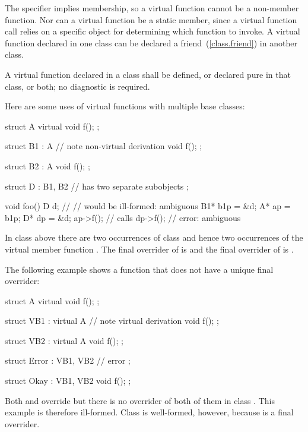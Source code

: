 \pnum
\begin{note}
The  specifier implies membership, so a virtual function
cannot be a non-member function. Nor can a virtual
function be a static member, since a virtual function call relies on a
specific object for determining which function to invoke. A virtual
function declared in one class can be declared a friend~(\ref{class.friend}) in
another class.
\end{note}

\pnum
{}%
A virtual function declared in a class shall be defined, or declared
pure in that class, or both; no diagnostic is
required.
%

\pnum
{}%
\begin{example}
Here are some uses of virtual functions with multiple base classes:
\begin{codeblock}
struct A {
  virtual void f();
};

struct B1 : A {                 // note non-virtual derivation
  void f();
};

struct B2 : A {
  void f();
};

struct D : B1, B2 {             //  has two separate  subobjects
};

void foo() {
  D   d;
//                  // would be ill-formed: ambiguous
  B1*  b1p = &d;
  A*   ap = b1p;
  D*   dp = &d;
  ap->f();                      // calls 
  dp->f();                      // error: ambiguous
}
\end{codeblock}
In class  above there are two occurrences of class 
and hence two occurrences of the virtual member function .
The final overrider of  is  and the final
overrider of  is .
\end{example}

\pnum
\begin{example}
The following example shows a function that does not have a unique final
overrider:
\begin{codeblock}
struct A {
  virtual void f();
};

struct VB1 : virtual A {        // note virtual derivation
  void f();
};

struct VB2 : virtual A {
  void f();
};

struct Error : VB1, VB2 {       // error
};

struct Okay : VB1, VB2 {
  void f();
};
\end{codeblock}
Both  and  override  but there
is no overrider of both of them in class . This example is
therefore ill-formed. Class  is well-formed, however,
because  is a final overrider.
\end{example}


